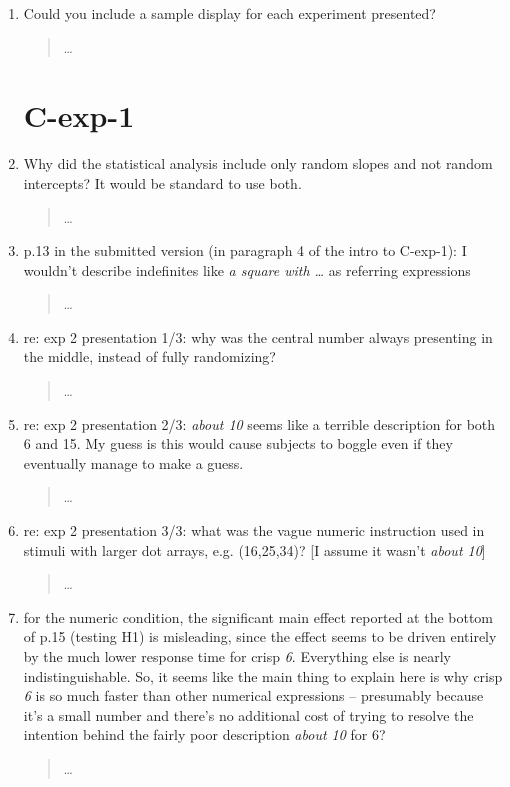 \documentclass{tufte-handout}
\begin{document}
\begin{enumerate}
\item Could you include a sample display for each experiment presented?
\begin{quote}\ldots\end{quote}

\section{C-exp-1}

\item Why did the statistical analysis include only random slopes and not random intercepts? It would be standard to use both.
\begin{quote}\ldots\end{quote}

\item p.13 in the submitted version (in paragraph 4 of the intro to C-exp-1): I wouldn't describe indefinites like \emph{a square with \ldots} as referring expressions
\begin{quote}\ldots\end{quote}

\item re: exp 2 presentation 1/3: why was the central number always presenting in the middle, instead of fully randomizing?
\begin{quote}\ldots\end{quote}

\item re: exp 2 presentation 2/3: \emph{about 10} seems like a terrible description for both 6 and 15. My guess is this would cause subjects to boggle even if they eventually manage to make a guess.
\begin{quote}\ldots\end{quote}

\item re: exp 2 presentation 3/3: what was the vague numeric instruction used in stimuli with larger dot arrays, e.g. (16,25,34)? [I assume it wasn't \emph{about 10}]
\begin{quote}\ldots\end{quote}

\item for the numeric condition, the significant main effect reported at the bottom of p.15 (testing H1) is misleading, since the effect seems to be driven entirely by the much lower response time for crisp \emph{6}. Everything else is nearly indistinguishable. So, it seems like the main thing to explain here is why crisp \emph{6} is so much faster than other numerical expressions -- presumably because it's a small number and there's no additional cost of trying to resolve the intention behind the fairly poor description \emph{about 10} for 6?
\begin{quote}\ldots\end{quote}


\end{enumerate}
\end{document}
